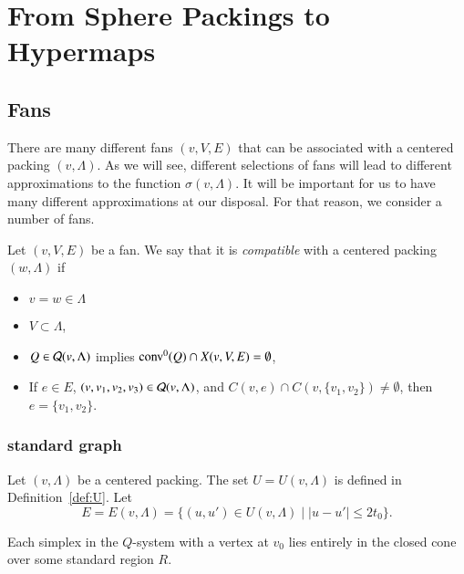 \chapter{From Sphere Packings to Hypermaps}
    \label{sec:intro}
\label{chapter:VQ}

\section{Fans}

There are many different fans $(v,V,E)$ that
can be associated with a centered packing $(v,\Lambda)$.
As we will see, different selections of fans
will lead to different approximations to the function $\sigma(v,\Lambda)$.
It will be important for us to have many different approximations
at our disposal.  For that reason, we consider a number of
fans.

\begin{definition}\label{def:compatible}
Let $(v,V,E)$ be a fan.  We say that it is
{\it compatible} with a centered packing $(w,\Lambda)$ 
if 
\begin{itemize}
\item 
$v=w\in\Lambda$
\item
 $V\subset \Lambda$, 
\item  $Q\in {\mathcal Q}(v,\Lambda)$ implies
${\operatorname{conv}}^0(Q)\cap X(v,V,E)=\emptyset$,
\item  If $e\in E$, $(v,v_1,v_2,v_3)\in {\mathcal Q}(v,\Lambda)$,
and $C(v,e)\cap C(v,\{v_1,v_2\})\ne \emptyset$, then
   $e = \{v_1,v_2\}$.
\end{itemize}
\end{definition}

\subsection{standard graph}

Let $(v,\Lambda)$ be a centered packing.  The set $U=U(v,\Lambda)$
is defined in Definition~\ref{def:U}.  
Let 
$$E = E(v,\Lambda) = \{(u,u')\in U(v,\Lambda) \mid |u-u'|\le 2t_0\}.
$$

\begin{lemma}
\label{lemma:Q-in-region} Each simplex in the $Q$-system with a
vertex at $v_0$ lies entirely in the closed cone over some
standard region $R$.
\end{lemma}

